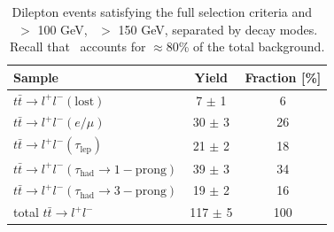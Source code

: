 \begin{table}[!ht]
\begin{center}
\begin{tabular}{l|c|c}
\hline
            Sample					&                Yield   & 	Fraction [\%]\\
\hline
\hline
$t\bar{t} \rightarrow l^{+}l^{-} (\mathrm{lost})$   &       7 $\pm$ 1 	& 	6\\
$t\bar{t} \rightarrow l^{+}l^{-} (e/\mu)$   &      30 $\pm$ 3  	& 26\\
$t\bar{t} \rightarrow l^{+}l^{-} (\tau_{\mathrm{lep}})$   &      21 $\pm$ 2  	& 18\\
$t\bar{t} \rightarrow l^{+}l^{-} (\tau_{\mathrm{had}}\rightarrow \mathrm{1-prong})$   &      39 $\pm$ 3  & 34\\
$t\bar{t} \rightarrow l^{+}l^{-} (\tau_{\mathrm{had}}\rightarrow \mathrm{3-prong})$   &      19 $\pm$ 2  & 16\\
\hline
         total $t\bar{t} \rightarrow l^{+}l^{-} $  &     117 $\pm$ 5  & 100\\
\hline
\end{tabular}
\caption{Dilepton events satisfying the full selection criteria
 and \met\ $>$ 100 GeV, \mt\ $>$ 150 GeV,  separated by decay modes.
Recall that \ttll\ accounts for $\approx80$\% of the total background.
\label{tab:ttdlcomposition}}
\end{center}
\end{table}

